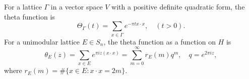 For a lattice $\Gamma$ in a vector space $V$ with a positive definite quadratic form, the theta function is
$$\Theta_\Gamma(t) = \sum_{x \in \Gamma} e^{-\pi t x \cdot x}, \quad (t > 0).$$
For a unimodular lattice $E \in S_n$, the theta function as a function on $H$ is
$$\theta_E(z) = \sum_{x \in E} e^{\pi i z (x \cdot x)} = \sum_{m=0}^{\infty} r_E(m) q^m, \quad q = e^{2\pi i z},$$
where $r_E(m) = \#\{x \in E : x \cdot x = 2m\}$.
